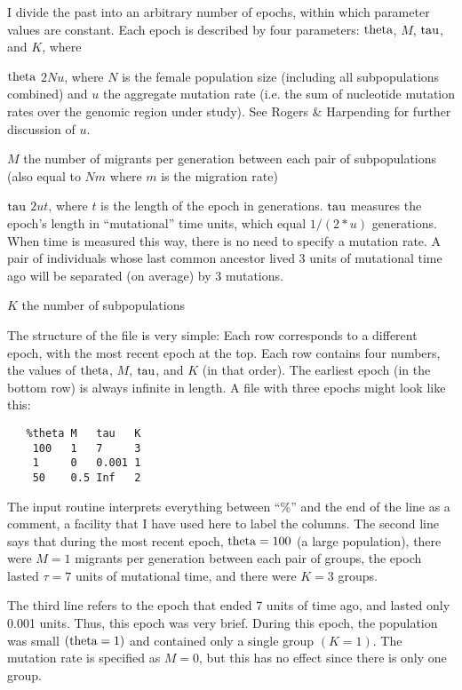 I divide the past into an arbitrary number of epochs, within which
parameter values are constant.  Each epoch is described by four
parameters: $\hbox{theta}$, $M$, $\hbox{tau}$, and $K$, where
\begin{definition}
\item[$\hbox{theta}$]$2Nu$, where $N$ is the female population size
      (including all subpopulations combined) and $u$ the aggregate
      mutation rate (i.e. the sum of nucleotide mutation rates over
      the genomic region under study).  See Rogers \& Harpending
      \cite{Rogers:MBE-9-552} for further discussion of $u$. 

\item[$M$]the number of migrants per generation between each pair of  
       subpopulations (also equal to $Nm$ where $m$ is the migration
       rate) 

\item[$\hbox{tau}$]$2ut$, where $t$ is the length of the epoch in
      generations.  $\hbox{tau}$ measures the epoch's length in
      ``mutational'' time units, which equal $1/(2*u)$ generations.
      When time is measured this way, there is no need to specify a
      mutation rate.  A pair of individuals whose last common ancestor
      lived 3 units of mutational time ago will be separated (on
      average) by 3 mutations. 

\item[$K$]the number of subpopulations
\end{definition}
The structure of the file  is very simple: Each row
corresponds to a different epoch, with the most recent epoch at the
top.  Each row contains four numbers, the values of $\hbox{theta}$, $M$,
$\hbox{tau}$, and $K$ (in that order).  The earliest epoch (in the bottom
row) is always infinite in length.  A  file with three
epochs might look like this:
\begin{verbatim}
   %theta M   tau   K
    100   1   7     3
    1     0   0.001 1
    50    0.5 Inf   2
\end{verbatim}
The input routine interprets everything between ``\%'' and the end of
the line as a comment, a facility that I have used here to label the
columns.  The second line says that during the most recent
epoch, $\hbox{theta}=100$ (a large population), there were $M=1$ migrants
per generation between each pair of groups, the epoch lasted $\tau=7$
units of mutational time, and there were $K=3$ groups.

The third line refers to the epoch that ended 7 units of time ago, and
lasted only 0.001 units.  Thus, this epoch was very brief.  During
this epoch, the population was small $(\hbox{theta}=1)$ and contained only a
single group $(K=1)$.  The mutation rate is specified as $M=0$, but
this has no effect since there is only one group.

